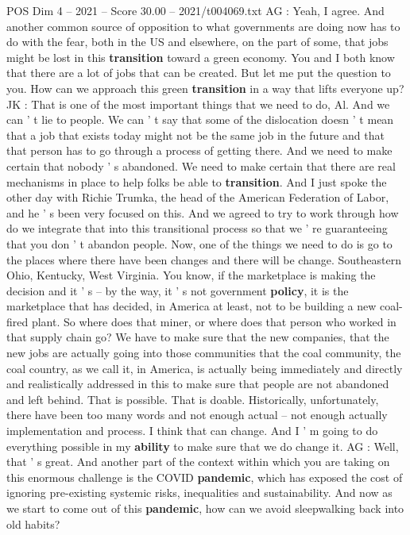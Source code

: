 \begin{textsample}{POS Dim 4 – 2021 – Score 30.00 – 2021/t004069.txt}
AG : Yeah, I agree.
And another common source of opposition to what governments are doing now has to do with the fear, both in the US and elsewhere, on the part of some, that jobs might be lost in this \textbf{transition} toward a green economy.
You and I both know that there are a lot of jobs that can be created.
But let me put the question to you.
How can we approach this green \textbf{transition} in a way that lifts everyone up?
JK : That is one of the most important things that we need to do, Al.
And we can ' t lie to people.
We can ' t say that some of the dislocation doesn ' t mean that a job that exists today might not be the same job in the future and that that person has to go through a process of getting there.
And we need to make certain that nobody ' s abandoned.
We need to make certain that there are real mechanisms in place to help folks be able to \textbf{transition}.
And I just spoke the other day with Richie Trumka, the head of the American Federation of Labor, and he ' s been very focused on this.
And we agreed to try to work through how do we integrate that into this transitional process so that we ' re guaranteeing that you don ' t abandon people.
Now, one of the things we need to do is go to the places where there have been changes and there will be change.
Southeastern Ohio, Kentucky, West Virginia.
You know, if the marketplace is making the decision and it ' s -- by the way, it ' s not government \textbf{policy}, it is the marketplace that has decided, in America at least, not to be building a new coal-fired plant.
So where does that miner, or where does that person who worked in that supply chain go?
We have to make sure that the new companies, that the new jobs are actually going into those communities that the coal community, the coal country, as we call it, in America, is actually being immediately and directly and realistically addressed in this to make sure that people are not abandoned and left behind.
That is possible.
That is doable.
Historically, unfortunately, there have been too many words and not enough actual -- not enough actually implementation and process.
I think that can change.
And I ' m going to do everything possible in my \textbf{ability} to make sure that we do change it.
AG : Well, that ' s great.
And another part of the context within which you are taking on this enormous challenge is the COVID \textbf{pandemic}, which has exposed the cost of ignoring pre-existing systemic risks, inequalities and sustainability.
And now as we start to come out of this \textbf{pandemic}, how can we avoid sleepwalking back into old habits?

\end{textsample}
